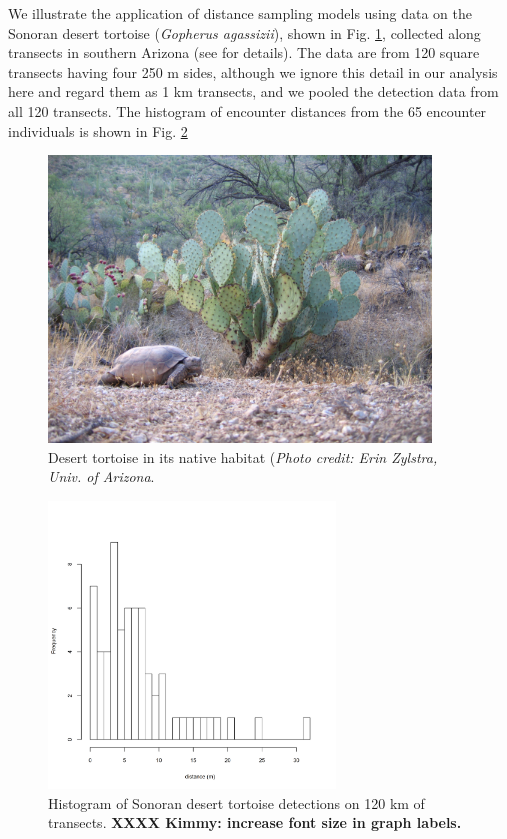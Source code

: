 We illustrate the application of distance sampling models using data
on the Sonoran desert tortoise ({\it Gopherus agassizii}), shown in
Fig. \ref{closed.fig.tortoise}, collected along transects
in southern Arizona (see \citet{zylstra_etal:2010} for
details). The data are from 120 square transects having four 250 m sides,
 although we ignore this detail in our analysis here and regard
them as 1 km transects, and we pooled the detection data from all
120 transects. The histogram of encounter distances from the 65
encounter individuals is
shown in Fig. \ref{closed.fig.tortoisehist}
\begin{figure}
\centering
\includegraphics[height=3in,width=4in]{Ch3-Closed/figs/Erin_Zylstra_2.jpg}
\caption{Desert tortoise in its native habitat ({\it Photo credit: Erin
  Zylstra, Univ. of Arizona}.}
\label{closed.fig.tortoise}
\end{figure}

\begin{figure}[h]
\centering
\includegraphics[height=3.0in,width=3.0in]{Ch3-Closed/figs/tortoise.png}
\caption{Histogram of Sonoran desert tortoise detections on 120 km of
transects. {\bf XXXX Kimmy: increase font size in graph labels.}  }
\label{closed.fig.tortoisehist}
\end{figure}

